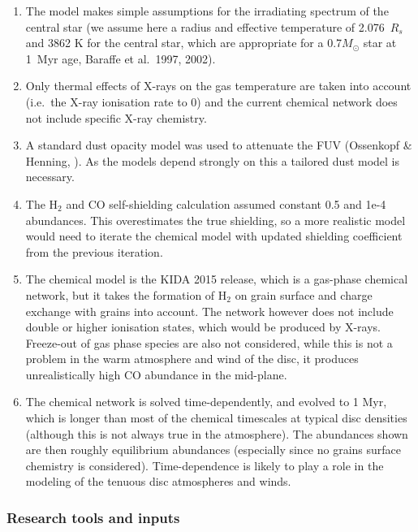 \documentclass[10pt,fleqn,twoside]{article}
\begin{document}
\begin{enumerate}
\item The model makes simple assumptions for the irradiating spectrum
of the central star (we assume here a radius and effective temperature
of 2.076~$R_s$ and 3862 K for the central star, which are appropriate
for a 0.7$M_{\odot}$ star at 1~Myr age, Baraffe et al.\ 1997, 2002).

\item Only thermal effects of X-rays on the gas
temperature are taken into account (i.e.\ the X-ray ionisation rate
to 0) and the current chemical network does not include specific
X-ray chemistry. 

\item A standard dust opacity model was used to attenuate
the FUV (Ossenkopf \& Henning, ). As the models depend strongly on
this a tailored dust model is necessary. 

\item The H$_2$ and CO self-shielding
calculation assumed constant 0.5 and 1e-4 abundances. This overestimates the true
shielding, so a more realistic model would need to iterate the
chemical model with updated shielding coefficient from the previous
iteration.

\item The chemical model is the KIDA 2015 release, which is a gas-phase
chemical network, but it takes the formation of H$_2$ on grain surface and
charge exchange with grains into account. The network however does not
include double or higher ionisation states, which would be produced by
X-rays. Freeze-out of gas phase species are also not considered, while
this is not a problem in the warm atmosphere and wind of the disc, it produces
unrealistically high CO abundance in the mid-plane. 

\item The chemical network is solved time-dependently, and evolved to 1 Myr,
which is longer than most of the chemical timescales at typical disc
densities (although this is not always true in the atmosphere). The
abundances shown are then roughly equilibrium abundances (especially since no
grains surface chemistry is considered). Time-dependence is likely to
play a role in the modeling of the tenuous disc atmospheres and
winds. 
\end{enumerate}

\subsubsection{Research tools and inputs}
\end{document}
